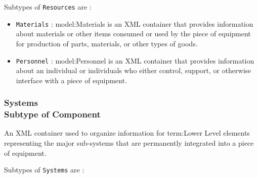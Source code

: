 Subtypes of \texttt{Resources} are :

\begin{itemize}
\item \texttt{Materials} : {model:Materials} is an XML container that provides information about materials or other items consumed or used by the piece of equipment for production of parts, materials, or other types of goods.

\item \texttt{Personnel} : {model:Personnel} is an XML container that provides information about an individual or individuals who either control, support, or otherwise interface with a piece of equipment.


\end{itemize}

\FloatBarrier
\subsubsection[Systems]{Systems \\ {\small Subtype of Component}}
  \label{type:Systems}

\FloatBarrier

An XML container used to organize information for {term:Lower Level} elements representing the major sub-systems that are permanently integrated into a piece of equipment.

Subtypes of \texttt{Systems} are :

